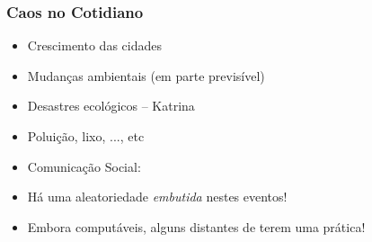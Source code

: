 \documentclass{beamer}
\begin{document}
\begin{comment}

\subsection{Caos}
\begin{frame}
\frametitle{Caos}

\begin{figure}[ht!]
 \centering
 \texttt{[image: figuras/fumaca\_complexa.jpg]}

\caption{Caos: indefinição de tempo, espaço sob o domínio dos reais} 

\end{figure}


\end{frame}
\end{comment}

\begin{frame}
\frametitle{Caos no Cotidiano}

\begin{block}{}%
  \begin{itemize}
   \item Crescimento das cidades

    \item Mudanças ambientais (em parte previsível)

    \item Desastres ecológicos -- Katrina

  \item Poluição, lixo, ..., etc

   \item Comunicação Social:
    
        \item<2-> Há uma aleatoriedade \textit{embutida} nestes eventos!
        
        \item<3-> Embora computáveis, alguns distantes de terem uma  prática!
        
    \end{itemize}
  
\end{block}


\end{frame}

\end{document}
